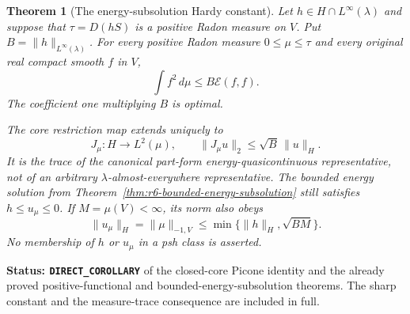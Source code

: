 \documentclass[11pt,a4paper]{article}
\numberwithin{equation}{section}
\newtheorem{theorem}{Theorem}[section]
\theoremstyle{definition}
\theoremstyle{remark}
\begin{document}
\begin{theorem}[The energy-subsolution Hardy constant]
\label{thm:r6-energy-subsolution-hardy}
Let $h\in H\cap L^\infty(\lambda)$ and suppose that
$\tau=D(hS)$ is a positive Radon measure on $V$. Put
$B=\|h\|_{L^\infty(\lambda)}$. For every positive Radon measure
$0\le\mu\le\tau$ and every original real compact smooth $f$ in $V$,
\begin{equation}
                        \int f^2\,d\mu\le B\mathcal E(f,f).
 \label{eq:r6-energy-subsolution-hardy}
\end{equation}
The coefficient one multiplying $B$ is optimal.

The core restriction map extends uniquely to
\[
                   J_\mu:H\longrightarrow L^2(\mu),
           \qquad \|J_\mu u\|_2\le\sqrt B\,\|u\|_H.
\]
It is the trace of the canonical part-form energy-quasicontinuous representative,
not of an arbitrary $\lambda$-almost-everywhere representative.
The bounded energy solution from
Theorem~\ref{thm:r6-bounded-energy-subsolution} still satisfies
$h\le u_\mu\le0$. If $M=\mu(V)<\infty$, its norm also obeys
\begin{equation}
             \|u_\mu\|_H=\|\mu\|_{-1,V}
                  \le\min\{\|h\|_H,\sqrt{BM}\}.
 \label{eq:r6-bounded-energy-data-height}
\end{equation}
No membership of $h$ or $u_\mu$ in a psh class is asserted.
\end{theorem}

\noindent\textbf{Status: \texttt{DIRECT\_COROLLARY}} of the
closed-core Picone identity and the already proved positive-functional
and bounded-energy-subsolution theorems. The sharp constant and the
measure-trace consequence are included in full.
\end{document}
